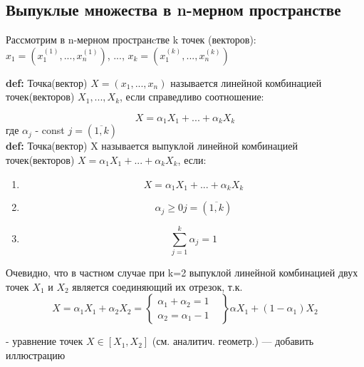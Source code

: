 \subsection{Выпуклые множества в n-мерном пространстве}
Рассмотрим в n-мерном пространcтве k точек (векторов): \\
$x_1 = (x_1^{(1)},...,x_n^{(1)})$, ..., $x_k = (x_1^{(k)},...,x_n^{(k)})$

\textbf{def:} Точка(вектор) $X = (x_1,...,x_n)$ называется линейной комбинацией точек(векторов) $X_1,...,X_k$, если справедливо соотношение:

\begin{equation}
X = \alpha_1 X_1 + ... + \alpha_k X_k
\end{equation} где $\alpha_j$ - const $j = (\overline{1,k})$ \\

\textbf{def:} Точка(вектор) X называется выпуклой линейной комбинацией точек(векторов) $X = \alpha_1 X_1 + ... + \alpha_k X_k$, если:

\begin{enumerate}
\item \begin{equation*}X = \alpha_1 X_1 + ... + \alpha_k X_k \end{equation*}
\item \begin{equation}\alpha_j \geq 0 j = (\overline{1,k}) \end{equation}
\item \begin{equation}\sum_{j=1}^{k}\alpha_j = 1 \end{equation} 
\end{enumerate}



Очевидно, что в частном случае при k=2 выпуклой линейной комбинацией двух точек $X_1$ и $X_2$ является соединяющий их отрезок, т.к. 
\[ 
X = \alpha_1 X_1 + \alpha_2 X_2 =  
    \left\{
        \begin{array}{lr} 
        \alpha_1 + \alpha_2 = 1 & \\ 
        \alpha_2 = \alpha_1 - 1
        \end{array}
    \right\}
\alpha X_1 + (1-\alpha_1)X_2
\]

- уравнение точек $X \in [X_1, X_2]$ (см. аналитич. геометр.)
--- добавить иллюстрацию

